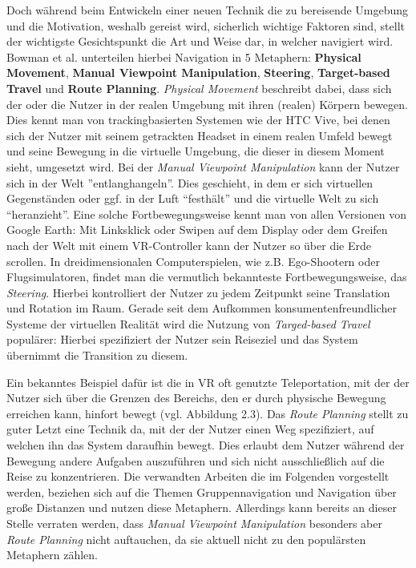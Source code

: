 Doch während beim Entwickeln einer neuen Technik die zu bereisende Umgebung und die Motivation, weshalb gereist wird, sicherlich wichtige Faktoren sind, stellt der wichtigste Gesichtspunkt die Art und Weise dar, in welcher navigiert wird. Bowman et al. \cite{Bowman2001AnDesign} unterteilen hierbei Navigation in 5 Metaphern: \textbf{Physical Movement}, \textbf{Manual Viewpoint Manipulation}, \textbf{Steering}, \textbf{Target-based Travel} und \textbf{Route Planning}. 
\textit{Physical Movement} beschreibt dabei, dass sich der oder die Nutzer in der realen Umgebung mit ihren (realen) Körpern bewegen. Dies kennt man von trackingbasierten Systemen wie der HTC Vive, bei denen sich der Nutzer mit seinem getrackten Headset in einem realen Umfeld bewegt und seine Bewegung in die virtuelle Umgebung, die dieser in diesem Moment sieht, umgesetzt wird.
Bei der \textit{Manual Viewpoint Manipulation} kann der Nutzer sich in der Welt ”entlanghangeln”. Dies geschieht, in dem er sich virtuellen Gegenständen oder ggf. in der Luft “festhält” und die virtuelle Welt zu sich “heranzieht”. Eine solche Fortbewegungsweise kennt man von allen Versionen von Google Earth: Mit Linksklick oder Swipen auf dem Display oder dem Greifen nach der Welt mit einem VR-Controller kann der Nutzer so über die Erde scrollen.
In dreidimensionalen Computerspielen, wie z.B. Ego-Shootern oder Flugsimulatoren, findet man die vermutlich bekannteste Fortbewegungsweise, das \textit{Steering}. Hierbei kontrolliert der Nutzer zu jedem Zeitpunkt seine Translation und Rotation im Raum.
Gerade seit dem Aufkommen konsumentenfreundlicher Systeme der virtuellen Realität wird die Nutzung von \textit{Targed-based Travel} populärer: Hierbei spezifiziert der Nutzer sein Reiseziel und das System übernimmt die Transition zu diesem. 

Ein bekanntes Beispiel dafür ist die in VR oft genutzte Teleportation, mit der der Nutzer sich über die Grenzen des Bereichs, den er durch physische Bewegung erreichen kann, hinfort bewegt (vgl. Abbildung 2.3).
Das \textit{Route Planning} stellt zu guter Letzt eine Technik da, mit der der Nutzer einen Weg spezifiziert, auf welchen ihn das System daraufhin bewegt. Dies erlaubt dem Nutzer während der Bewegung andere Aufgaben auszuführen und sich nicht ausschließlich auf die Reise zu konzentrieren. Die verwandten Arbeiten die im Folgenden vorgestellt werden, beziehen sich auf die Themen Gruppennavigation und Navigation über große Distanzen und nutzen diese Metaphern. Allerdings kann bereits an dieser Stelle verraten werden, dass \textit{Manual Viewpoint Manipulation} besonders aber \textit{Route Planning} nicht auftauchen, da sie aktuell nicht zu den populärsten Metaphern zählen.

